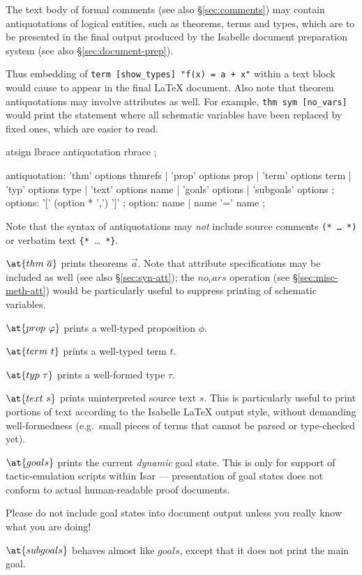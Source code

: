 The text body of formal comments (see also \S\ref{sec:comments}) may contain
antiquotations of logical entities, such as theorems, terms and types, which
are to be presented in the final output produced by the Isabelle document
preparation system (see also \S\ref{sec:document-prep}).

Thus embedding of
\texttt{{\at}{\ttlbrace}term~[show_types]~"f(x)~=~a~+~x"{\ttrbrace}} within a
text block would cause
to appear in the final {\LaTeX} document.  Also note that theorem
antiquotations may involve attributes as well.  For example,
\texttt{{\at}{\ttlbrace}thm~sym~[no_vars]{\ttrbrace}} would print the
statement where all schematic variables have been replaced by fixed ones,
which are easier to read.

\begin{rail}
  atsign lbrace antiquotation rbrace
  ;

  antiquotation:
    'thm' options thmrefs |
    'prop' options prop |
    'term' options term |
    'typ' options type |
    'text' options name |
    'goals' options |
    'subgoals' options
  ;
  options: '[' (option * ',') ']'
  ;
  option: name | name '=' name
  ;
\end{rail}

Note that the syntax of antiquotations may \emph{not} include source comments
\texttt{(*~\dots~*)} or verbatim text \verb|{*|~\dots~\verb|*}|.

\begin{descr}
\item [$\at\{thm~\vec a\}$] prints theorems $\vec a$. Note that attribute
  specifications may be included as well (see also \S\ref{sec:syn-att}); the
  $no_vars$ operation (see \S\ref{sec:misc-meth-att}) would be particularly
  useful to suppress printing of schematic variables.
\item [$\at\{prop~\phi\}$] prints a well-typed proposition $\phi$.
\item [$\at\{term~t\}$] prints a well-typed term $t$.
\item [$\at\{typ~\tau\}$] prints a well-formed type $\tau$.
\item [$\at\{text~s\}$] prints uninterpreted source text $s$.  This is
  particularly useful to print portions of text according to the Isabelle
  {\LaTeX} output style, without demanding well-formedness (e.g.\ small pieces
  of terms that cannot be parsed or type-checked yet).
\item [$\at\{goals\}$] prints the current \emph{dynamic} goal state.  This is
  only for support of tactic-emulation scripts within Isar --- presentation of
  goal states does not conform to actual human-readable proof documents.
  
  Please do not include goal states into document output unless you really
  know what you are doing!
\item [$\at\{subgoals\}$] behaves almost like $goals$, except that it does not
  print the main goal.
\end{descr}

